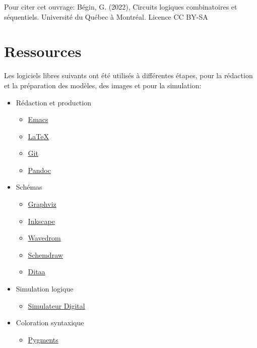 \documentclass[letter, oneside]{book}
\begin{document}
Pour citer cet ouvrage: Bégin, G. (2022), Circuits logiques
combinatoires et séquentiels. Université du Québec à Montréal. Licence CC BY-SA

\begin{center}
\href{https://uqam.ca/}{} 
\end{center}

\section*{Ressources}
\label{sec:orgcda156f}

Les logiciels libres suivants ont été utilisés à différentes étapes,
pour la rédaction et la préparation des modèles, des images et pour la
simulation:

\begin{itemize}
\item Rédaction et production
\begin{itemize}
\item \href{https://www.gnu.org/software/emacs/}{Emacs}
\item \href{https://www.latex-project.org/}{\LaTeX{}}
\item \href{https://git-scm.com}{Git}
\item \href{https://pandoc.org/}{Pandoc}
\end{itemize}
\item Schémas
\begin{itemize}
\item \href{https://graphviz.org/}{Graphviz}
\item \href{https://inkscape.org}{Inkscape}
\item \href{https://wavedrom.com/}{Wavedrom}
\item \href{https://schemdraw.readthedocs.io/en/latest/}{Schemdraw}
\item \href{https://ditaa.sourceforge.net/}{Ditaa}
\end{itemize}
\item Simulation logique
\begin{itemize}
\item \href{https://github.com/hneemann/Digital}{Simulateur Digital}
\end{itemize}
\item Coloration syntaxique
\begin{itemize}
\item \href{https://pygments.org/docs/quickstart/}{Pygments}
\end{itemize}
\end{itemize}
\end{document}
